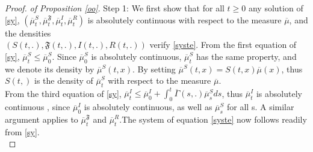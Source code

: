 \documentclass[10pt,a4paper]{amsart}
\begin{document}
\begin{proof}\textit{of Proposition \ref{oo}}.
Step 1: We first show that for all $t\geq 0$ any solution of \eqref{sy}, $\left(\overline{\mu}^S_t,\overline{\mu}_t^{\mathfrak{F}},\overline{\mu}_t^{I},\overline{\mu}_t^{R}\right)$ is absolutely continuous with respect to the measure $\overline{\mu}$, and the densities\\ $\left(S(t,.), \mathfrak{F}(t,.), I(t,.) ,R(t,.)\right)$ verify \eqref{syste}.
 From the first equation of \eqref{sy}, $\overline{\mu}^S_t\leq \overline{\mu}^S_0$. Since $\overline{\mu}^S_0$ is absolutely continuous,  $\overline{\mu}^S_t$ has the same property, and we denote its density by $\overline{\mu}^S(t,x)$. By setting $\overline{\mu}^S(t,x)= S(t,x)\overline{\mu}(x)$, thus $S(t,)$ is the density of $\overline{\mu}^S_t$ with respect to the measure $\overline{\mu}$.\\ 
From the third equation of \eqref{sy}, $\displaystyle \overline{\mu}_t^{I}\leq  \overline{\mu}_0^{I}+ \int_0^t \overline{\Gamma}(s,.)\overline{\mu}^{S}_sds$, thus $\overline{\mu}_t^{I}$ is absolutely continuous , since $\overline{\mu}^I_0$ is absolutely continuous, as well as $\overline{\mu}^{S}_s$ for all s. 
A similar argument applies  to $ \overline{\mu}_t^{\mathfrak{F}}$ and $ \overline{\mu}_t^{R}$.The system of equation \eqref{syste} now follows readily from \eqref{sy}.\\
\smallskip


\end{proof}
\end{document}
